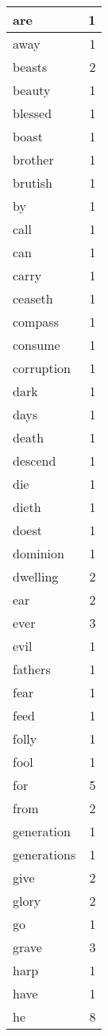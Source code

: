 \begin{center}
\begin{longtable}{l|r}
are & 1 \\ \hline
away & 1 \\ \hline
beasts & 2 \\ \hline
beauty & 1 \\ \hline
blessed & 1 \\ \hline
boast & 1 \\ \hline
brother & 1 \\ \hline
brutish & 1 \\ \hline
by & 1 \\ \hline
call & 1 \\ \hline
can & 1 \\ \hline
carry & 1 \\ \hline
ceaseth & 1 \\ \hline
compass & 1 \\ \hline
consume & 1 \\ \hline
corruption & 1 \\ \hline
dark & 1 \\ \hline
days & 1 \\ \hline
death & 1 \\ \hline
descend & 1 \\ \hline
die & 1 \\ \hline
dieth & 1 \\ \hline
doest & 1 \\ \hline
dominion & 1 \\ \hline
dwelling & 2 \\ \hline
ear & 2 \\ \hline
ever & 3 \\ \hline
evil & 1 \\ \hline
fathers & 1 \\ \hline
fear & 1 \\ \hline
feed & 1 \\ \hline
folly & 1 \\ \hline
fool & 1 \\ \hline
for & 5 \\ \hline
from & 2 \\ \hline
generation & 1 \\ \hline
generations & 1 \\ \hline
give & 2 \\ \hline
glory & 2 \\ \hline
go & 1 \\ \hline
grave & 3 \\ \hline
harp & 1 \\ \hline
have & 1 \\ \hline
he & 8 \\ \hline

\end{longtable}
\end{center}
